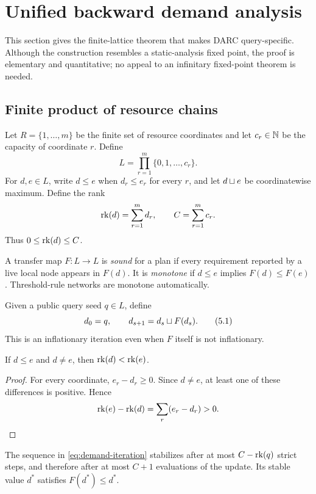 \section{Unified backward demand analysis}
\label{sec:demand}

This section gives the finite-lattice theorem that makes DARC query-specific.
Although the construction resembles a static-analysis fixed point, the proof
is elementary and quantitative; no appeal to an infinitary fixed-point theorem
is needed.

\subsection{Finite product of resource chains}

Let \(R=\{1,\ldots,m\}\) be the finite set of resource coordinates and let
\(c_r\in\mathbb{N}\) be the capacity of coordinate \(r\).  Define
\[
  L=\prod_{r=1}^{m}\{0,1,\ldots,c_r\}.
\]
For \(d,e\in L\), write \(d\le e\) when \(d_r\le e_r\) for every \(r\), and
let \(d\mathbin{\sqcup} e\) be coordinatewise maximum.  Define the rank
\[
  \operatorname{rk}(d)=\sum_{r=1}^{m}d_r,
  \qquad C=\sum_{r=1}^{m}c_r.
\]
Thus \(0\le\operatorname{rk}(d)\le C\).

A transfer map \(F:L\to L\) is \emph{sound} for a plan if every requirement
reported by a live local node appears in \(F(d)\).  It is \emph{monotone} if
\(d\le e\) implies \(F(d)\le F(e)\).  Threshold-rule networks are monotone
automatically.

Given a public query seed \(q\in L\), define
\[
  d_0=q,
  \qquad
  d_{s+1}=d_s\mathbin{\sqcup} F(d_s).
  \tag{5.1}\label{eq:demand-iteration}
\]
This is an inflationary iteration even when \(F\) itself is not inflationary.

\begin{lemma}
\label{lem:rank-increase}
If \(d\le e\) and \(d\ne e\), then \(\operatorname{rk}(d)<\operatorname{rk}(e)\).
\end{lemma}

\begin{proof}
For every coordinate, \(e_r-d_r\ge0\).  Since \(d\ne e\), at least one of
these differences is positive.  Hence
\[
 \operatorname{rk}(e)-\operatorname{rk}(d)=\sum_r(e_r-d_r)>0.
\]
\end{proof}

\begin{theorem}
\label{thm:demand-stabilization}
The sequence in \eqref{eq:demand-iteration} stabilizes after at most
\(C-\operatorname{rk}(q)\) strict steps, and therefore after at most \(C+1\) evaluations
of the update.  Its stable value \(d^*\) satisfies \(F(d^*)\le d^*\).
\end{theorem}

